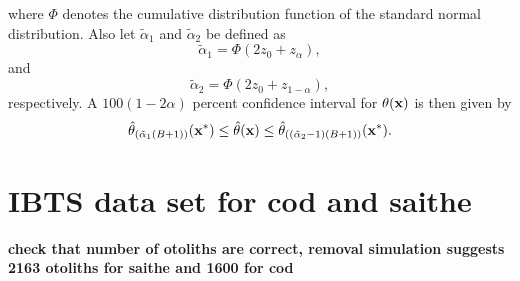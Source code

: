\documentclass[a4paper 12pt]{article}
\numberwithin{equation}{section}
\begin{document}
\noindent where $  \Phi $  denotes the cumulative distribution function of the standard normal distribution. Also let $\tilde{\alpha}_{1} $ and $\tilde{\alpha}_{2} $ be defined as
\begin{equation}
\tilde{\alpha}_{1} = \Phi(2z_{0} + z_{\alpha}), 
\end{equation}
\noindent and 
\begin{equation}
\tilde{\alpha}_{2} = \Phi(2z_{0} + z_{1-\alpha}), 
\end{equation}
\noindent respectively.  A $100(1-2 \alpha)$ percent confidence interval for $ \theta ({\bf x})$ is then given by
\begin{equation}
\hat{\theta}_{\left(\tilde{\alpha}_{1}(B +1) \right)} ({\bf {x}^{*}})  \leq \hat{\theta} ({\bf x}) \leq \hat{\theta}_{\left((\tilde{\alpha}_{2} -1)(B +1) \right)} ({\bf {x}^{*}}). 
\end{equation}
\section{IBTS data set for cod and saithe}
\label{secAp:data}
{\bf check that number of otoliths are correct, removal simulation suggests 2163 otoliths for saithe and 1600 for cod}\\
\end{document}
